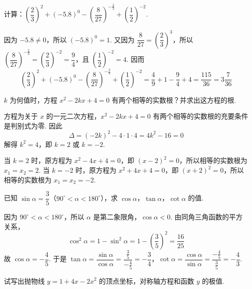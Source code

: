 \begin{problem}
计算：\(\left(\dfrac{2}{3}\right)^2+\left(-5.8\right)^0-\left(\dfrac{8}{27}\right)^{-\frac23}+\left(\dfrac12\right)^{-2}\).
\end{problem}

\begin{solution}
因为 \(-5.8\neq0\)，所以 \(\left(-5.8\right)^0=1\). 又因为 \(\dfrac{8}{27}=\left(\dfrac23\right)^3\)，所以 \(\left(\dfrac{8}{27}\right)^{-\frac23}=\left(\dfrac23\right)^{-2}=\dfrac94\)，且 \(\left(\dfrac12\right)^{-2}=4\). 因而
\[
\left(\dfrac{2}{3}\right)^2+\left(-5.8\right)^0-\left(\dfrac{8}{27}\right)^{-\frac23}+\left(\dfrac12\right)^{-2}=\dfrac49+1-\dfrac94+4=\dfrac{115}{36}=3\dfrac7{36}
\]
\end{solution}

\begin{problem}
\(k\) 为何值时，方程 \(x^2-2kx+4=0\) 有两个相等的实数根？并求出这方程的根.
\end{problem}

\begin{solution}
方程为关于 \(x\) 的一元二次方程，\(x^2-2kx+4=0\) 有两个相等的实数根的充要条件是判别式为零. 因此
\[
\Delta=(-2k)^2-4\cdot1\cdot4=4k^2-16=0
\]
解得 \(k^2=4\)，即 \(k=2\) 或 \(k=-2\).

当 \(k=2\) 时，原方程为 \(x^2-4x+4=0\)，即 \((x-2)^2=0\)，所以相等的实数根为 \(x_1=x_2=2\). 当 \(k=-2\) 时，原方程为 \(x^2+4x+4=0\)，即 \((x+2)^2=0\)，所以相等的实数根为 \(x_1=x_2=-2\).
\end{solution}

\begin{problem}
已知 \(\sin\alpha=\dfrac35\)（\(90^\circ<\alpha<180^\circ\)），求 \(\cos\alpha\)，\(\tan\alpha\)，\(\cot\alpha\) 的值.
\end{problem}

\begin{solution}
因为 \(90^\circ<\alpha<180^\circ\)，所以 \(\alpha\) 是第二象限角，\(\cos\alpha<0\). 由同角三角函数的平方关系，
\[
\cos^2\alpha=1-\sin^2\alpha=1-\left(\dfrac35\right)^2=\dfrac{16}{25}
\]
故 \(\cos\alpha=-\dfrac45\). 于是 \(\tan\alpha=\dfrac{\sin\alpha}{\cos\alpha}=\dfrac{\frac{3}{5}}{-\frac{4}{5}}=-\dfrac34\)，\(\cot\alpha=\dfrac{\cos\alpha}{\sin\alpha}=\dfrac{-\frac{4}{5}}{\frac{3}{5}}=-\dfrac43\).
\end{solution}

\begin{problem}
试写出抛物线 \(y=1+4x-2x^2\) 的顶点坐标，对称轴方程和函数 \(y\) 的极值.
\end{problem}

